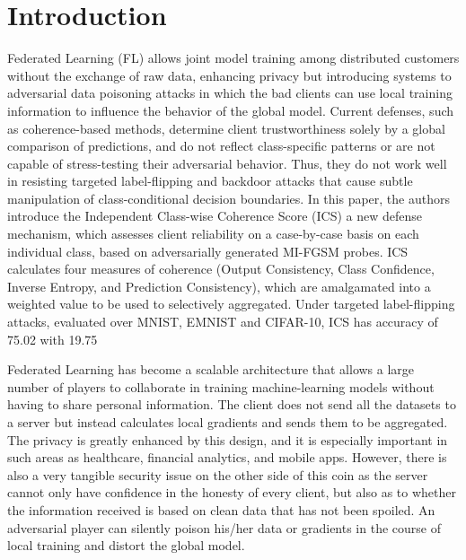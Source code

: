 \documentclass[conference]{IEEEtran}
\begin{document}
\section{Introduction}
Federated Learning (FL) allows joint model training among distributed customers without the exchange of raw data, enhancing privacy but introducing systems to adversarial data poisoning attacks in which the bad clients can use local training information to influence the behavior of the global model. Current defenses, such as coherence-based methods, determine client trustworthiness solely by a global comparison of predictions, and do not reflect class-specific patterns or are not capable of stress-testing their adversarial behavior. Thus, they do not work well in resisting targeted label-flipping and backdoor attacks that cause subtle manipulation of class-conditional decision boundaries. In this paper, the authors introduce the Independent Class-wise Coherence Score (ICS) a new defense mechanism, which assesses client reliability on a case-by-case basis on each individual class, based on adversarially generated MI-FGSM probes. ICS calculates four measures of coherence (Output Consistency, Class Confidence, Inverse Entropy, and Prediction Consistency), which are amalgamated into a weighted value to be used to selectively aggregated. Under targeted label-flipping attacks, evaluated over MNIST, EMNIST and CIFAR-10, ICS has accuracy of 75.02 with 19.75%

Federated Learning has become a scalable architecture that allows a large number of players to collaborate in training machine-learning models without having to share personal information. The client does not send all the datasets to a server but instead calculates local gradients and sends them to be aggregated\cite{bagdasaryan2020backdoor}. The privacy is greatly enhanced by this design, and it is especially important in such areas as healthcare, financial analytics, and mobile apps. However, there is also a very tangible security issue on the other side of this coin as the server cannot only have confidence in the honesty of every client, but also as to whether the information received is based on clean data that has not been spoiled. An adversarial player can silently poison his/her data or gradients in the course of local training and distort the global model.
\end{document}
